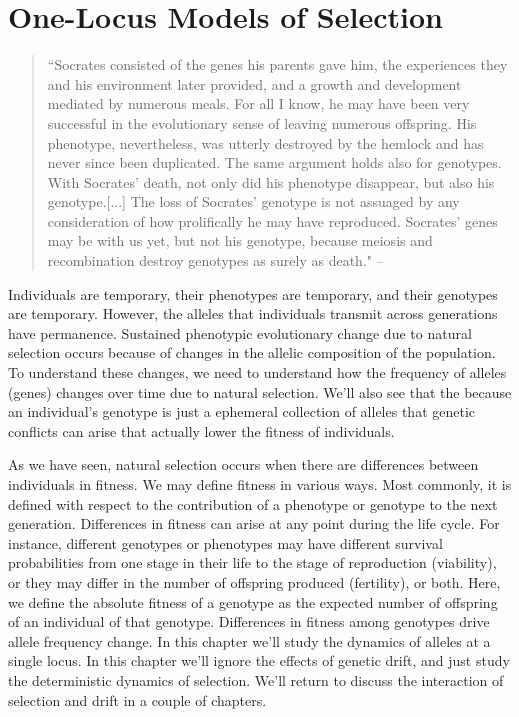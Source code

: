 \chapter{One-Locus Models of Selection}
\label{Chapter:OneLocusSelection}
\begin{quotation}
``Socrates consisted of the genes his parents gave him, the experiences they and his environment later provided, and a growth and development mediated by numerous meals. For all I know, he may have been very successful in the evolutionary sense of leaving numerous offspring. His phenotype, nevertheless, was utterly destroyed by the hemlock and has never since been duplicated. The same argument holds also for genotypes. With Socrates' death, not only did his phenotype disappear, but also his genotype.[...] The loss of Socrates' genotype is not assuaged by any consideration of how prolifically he may have reproduced. Socrates' genes may be with us yet, but not his genotype, because meiosis and recombination destroy genotypes as surely as death." --\citet{Williams:66}
\end{quotation}
  
Individuals are temporary, their phenotypes are temporary, and their
genotypes are temporary. However, the alleles that individuals
transmit across generations have permanence. Sustained phenotypic
evolutionary change due to natural selection occurs because of changes
in the allelic composition of the population. To understand these
changes, we need to understand how the frequency of alleles (genes)
changes over time due to natural selection.  We'll also see that the
because an individual's genotype is just a ephemeral collection of
alleles that genetic conflicts can arise that actually lower the fitness of
individuals. 

As we have seen, natural selection occurs when there are differences between individuals in fitness. We may define fitness in various ways. Most commonly, it is defined with respect to the contribution of a phenotype or genotype to the next generation. 
Differences in fitness can arise at any point during the life
cycle. For instance, different genotypes or phenotypes may have
different survival probabilities from one stage in their life to the
stage of reproduction (viability), or they may differ in the number of
offspring produced (fertility), or both. Here, we define the absolute
fitness of a genotype as the expected number of offspring of an
individual of that genotype. Differences in fitness among genotypes
drive allele frequency change. In this chapter we'll study the
dynamics of alleles at a single locus. In this chapter we'll ignore
the effects of genetic drift, and just study the deterministic
dynamics of selection. We'll return to discuss the interaction of
selection and drift in a couple of chapters.\\


